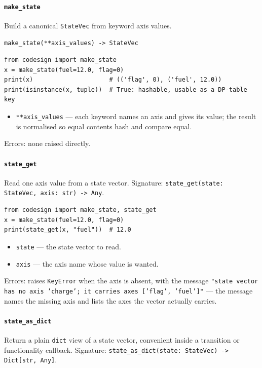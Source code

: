 \documentclass[11pt,a4paper]{article}
\begin{document}
\paragraph{\texttt{make\_state}}\label{ref:state:make_state}
Build a canonical \texttt{StateVec} from keyword axis values.

\begin{lstlisting}
make_state(**axis_values) -> StateVec
\end{lstlisting}

\begin{lstlisting}
from codesign import make_state
x = make_state(fuel=12.0, flag=0)
print(x)                     # (('flag', 0), ('fuel', 12.0))
print(isinstance(x, tuple))  # True: hashable, usable as a DP-table key
\end{lstlisting}

\begin{itemize}[nosep]
  \item \texttt{**axis\_values} --- each keyword names an axis and gives its
    value; the result is normalised so equal contents hash and compare
    equal.
\end{itemize}
Errors: none raised directly.

\paragraph{\texttt{state\_get}}\label{ref:state:state_get}
Read one axis value from a state vector.
Signature: \texttt{state\_get(state: StateVec, axis: str) -> Any}.

\begin{lstlisting}
from codesign import make_state, state_get
x = make_state(fuel=12.0, flag=0)
print(state_get(x, "fuel"))  # 12.0
\end{lstlisting}

\begin{itemize}[nosep]
  \item \texttt{state} --- the state vector to read.
  \item \texttt{axis} --- the axis name whose value is wanted.
\end{itemize}
Errors: raises \texttt{KeyError} when the axis is absent, with the message
\texttt{"state vector has no axis 'charge'; it carries axes ['flag',
'fuel']"} --- the message names the missing axis and lists the axes the
vector actually carries.

\paragraph{\texttt{state\_as\_dict}}\label{ref:state:state_as_dict}
Return a plain \texttt{dict} view of a state vector, convenient inside a
transition or functionality callback.
Signature: \texttt{state\_as\_dict(state: StateVec) -> Dict[str, Any]}.
\end{document}
